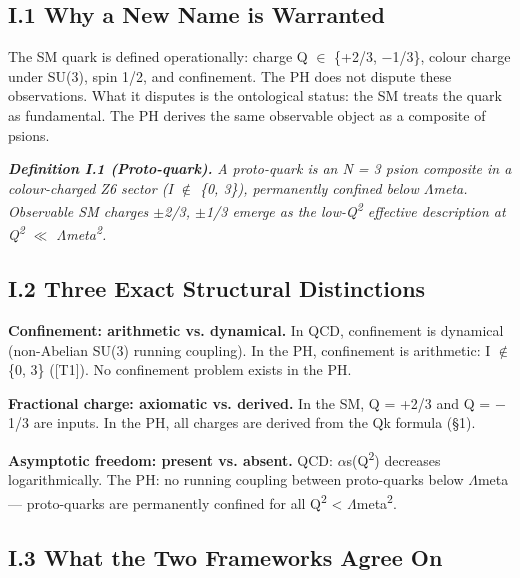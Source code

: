 \documentclass[11pt,letterpaper]{article}
\begin{document}
\subsection*{I.1  Why a New Name is Warranted}

\noindent The SM quark is defined operationally: charge Q $\in$ \{+2/3, $-$1/3\}, colour charge under SU(3), spin 1/2, and confinement. The PH does not dispute these observations. What it disputes is the ontological status: the SM treats the quark as fundamental. The PH derives the same observable object as a composite of psions.

\noindent \textbf{\textit{Definition I.1 (Proto-quark). }}\textit{A proto-quark is an N = 3 psion composite in a colour-charged Z6 sector (I $\notin$ \{0, 3\}), permanently confined below $\Lambda$meta. Observable SM charges $\pm$2/3, $\pm$1/3 emerge as the low-Q\textsuperscript{2} effective description at Q\textsuperscript{2} $\ll$ $\Lambda$meta\textsuperscript{2}.}

\subsection*{I.2  Three Exact Structural Distinctions}

\noindent \textbf{Confinement: arithmetic vs. dynamical. }In QCD, confinement is dynamical (non-Abelian SU(3) running coupling). In the PH, confinement is arithmetic: I $\notin$ \{0, 3\} ([T1]). No confinement problem exists in the PH.

\noindent \textbf{Fractional charge: axiomatic vs. derived. }In the SM, Q = +2/3 and Q = $-$1/3 are inputs. In the PH, all charges are derived from the Qk formula (§1).

\noindent \textbf{Asymptotic freedom: present vs. absent. }QCD: $\alpha$s(Q\textsuperscript{2}) decreases logarithmically. The PH: no running coupling between proto-quarks below $\Lambda$meta --- proto-quarks are permanently confined for all Q\textsuperscript{2} < $\Lambda$meta\textsuperscript{2}.

\subsection*{I.3  What the Two Frameworks Agree On}
\end{document}
